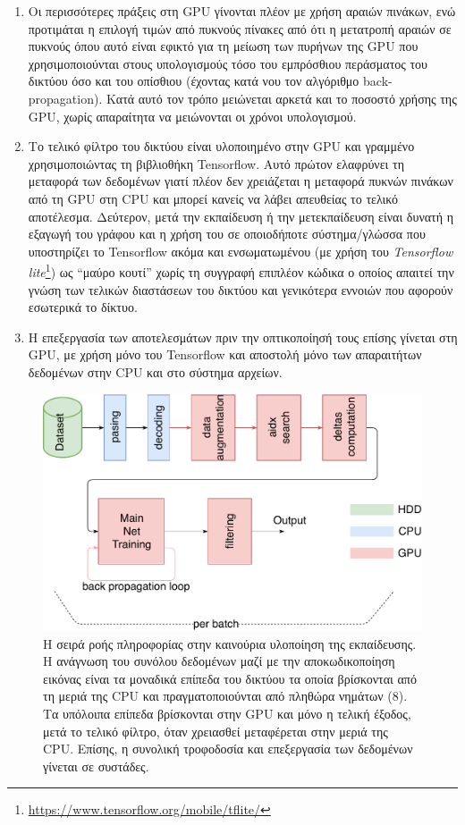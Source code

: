 \begin{enumerate}
\item{Οι περισσότερες πράξεις στη GPU γίνονται πλέον με χρήση αραιών πινάκων, ενώ προτιμάται η επιλογή τιμών από πυκνούς πίνακες από ότι η μετατροπή αραιών σε πυκνούς όπου αυτό είναι εφικτό για τη μείωση των πυρήνων της GPU που χρησιμοποιούνται στους υπολογισμούς τόσο του εμπρόσθιου περάσματος του δικτύου όσο και του οπίσθιου (έχοντας κατά νου τον αλγόριθμο back-propagation). Κατά αυτό τον τρόπο μειώνεται αρκετά και το ποσοστό χρήσης της GPU, χωρίς απαραίτητα να μειώνονται οι χρόνοι υπολογισμού.}
\item{Το τελικό φίλτρο του δικτύου είναι υλοποιημένο στην GPU και γραμμένο χρησιμοποιώντας τη βιβλιοθήκη Tensorflow. Αυτό πρώτον ελαφρύνει τη μεταφορά των δεδομένων γιατί πλέον δεν χρειάζεται η μεταφορά πυκνών πινάκων από τη GPU στη CPU και μπορεί κανείς να λάβει απευθείας το τελικό αποτέλεσμα. Δεύτερον, μετά την εκπαίδευση ή την μετεκπαίδευση είναι δυνατή η εξαγωγή του γράφου και η χρήση του σε οποιοδήποτε σύστημα/γλώσσα που υποστηρίζει το Tensorflow ακόμα και ενσωματωμένου (με χρήση του \textit{Tensorflow lite}\footnote{\url{https://www.tensorflow.org/mobile/tflite/}}) ως “μαύρο κουτί” χωρίς τη συγγραφή επιπλέον κώδικα ο οποίος απαιτεί την γνώση των τελικών διαστάσεων του δικτύου και γενικότερα εννοιών που αφορούν εσωτερικά το δίκτυο.}
\item{Η επεξεργασία των αποτελεσμάτων πριν την οπτικοποίησή τους επίσης γίνεται στη GPU, με χρήση μόνο του Tensorflow και αποστολή μόνο των απαραιτήτων δεδομένων στην CPU και στο σύστημα αρχείων.}
\end{enumerate}

\begin{figure}
\centering
\includegraphics[width = \textwidth]{figures/experiments/new_pipeline.pdf}
\caption[Η σειρά ροής πληροφορίας στην καινούρια υλοποίηση της εκπαίδευσης]{Η σειρά ροής πληροφορίας στην καινούρια υλοποίηση της εκπαίδευσης. Η ανάγνωση του συνόλου δεδομένων μαζί με την αποκωδικοποίηση εικόνας είναι τα μοναδικά επίπεδα του δικτύου τα οποία βρίσκονται από τη μεριά της CPU και πραγματοποιούνται από πληθώρα νημάτων (8). Τα υπόλοιπα επίπεδα βρίσκονται στην GPU και μόνο η τελική έξοδος, μετά το τελικό φίλτρο, όταν χρειασθεί μεταφέρεται στην μεριά της CPU. Επίσης, η συνολική τροφοδοσία και επεξεργασία των δεδομένων γίνεται σε συστάδες.}
\label{fig:new_pipeline}
\end{figure}

